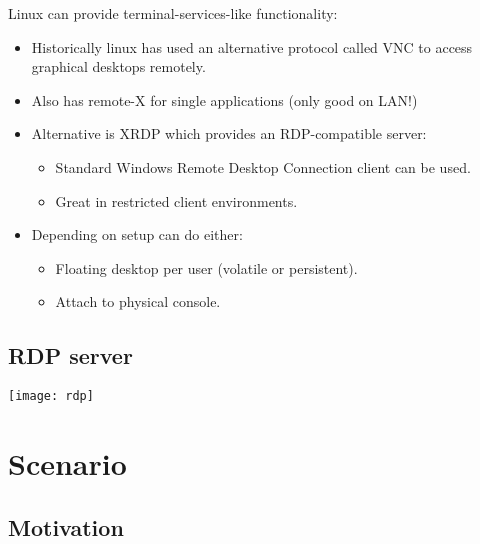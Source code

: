 \documentclass[slides]{pgnotes}
\begin{document}
Linux can provide terminal-services-like functionality:
\begin{itemize}
\item Historically linux has used an alternative protocol called VNC to access graphical desktops remotely.
\item Also has remote-X for single applications (only good on LAN!)
\item Alternative is XRDP which provides an RDP-compatible server:
  \begin{itemize}
  \item Standard Windows Remote Desktop Connection client can be used.
  \item Great in restricted client environments.
  \end{itemize}
\item Depending on setup can do either:
  \begin{itemize}
  \item Floating desktop per user (volatile or persistent).
  \item Attach to physical console.
  \end{itemize}
\end{itemize}

\subsection{RDP server}

\begin{center}
  \texttt{[image: rdp]}
\end{center}



\section{Scenario}



\subsection{Motivation}
\end{document}
